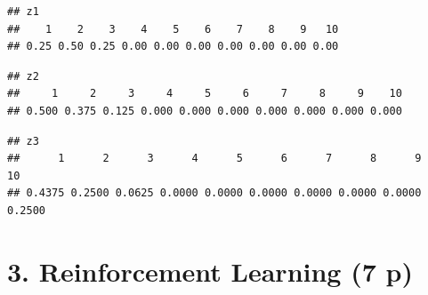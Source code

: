 \documentclass[
]{article}
\newenvironment{Shaded}{\begin{snugshade}}{\end{snugshade}}
\newcommand{\AttributeTok}[1]{\textcolor[rgb]{0.13,0.29,0.53}{#1}}
\newcommand{\FunctionTok}[1]{\textcolor[rgb]{0.13,0.29,0.53}{\textbf{#1}}}
\newcommand{\NormalTok}[1]{#1}
\newcommand{\SpecialCharTok}[1]{\textcolor[rgb]{0.81,0.36,0.00}{\textbf{#1}}}
\newcommand{\StringTok}[1]{\textcolor[rgb]{0.31,0.60,0.02}{#1}}
\begin{document}
\begin{verbatim}
## z1
##    1    2    3    4    5    6    7    8    9   10 
## 0.25 0.50 0.25 0.00 0.00 0.00 0.00 0.00 0.00 0.00
\end{verbatim}

\begin{Shaded}
\end{Shaded}

\begin{verbatim}
## z2
##     1     2     3     4     5     6     7     8     9    10 
## 0.500 0.375 0.125 0.000 0.000 0.000 0.000 0.000 0.000 0.000
\end{verbatim}

\begin{Shaded}
\end{Shaded}

\begin{verbatim}
## z3
##      1      2      3      4      5      6      7      8      9     10 
## 0.4375 0.2500 0.0625 0.0000 0.0000 0.0000 0.0000 0.0000 0.0000 0.2500
\end{verbatim}

\section{3. Reinforcement Learning (7
p)}\label{reinforcement-learning-7-p}
\end{document}
